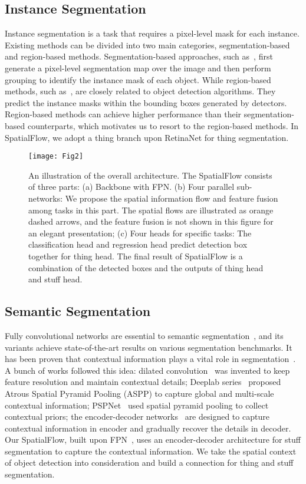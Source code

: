 \documentclass[journal,final]{IEEEtran}
\begin{document}
\subsection{Instance Segmentation} 
Instance segmentation is a task that requires a pixel-level mask for each instance. Existing methods can be divided into two main categories, segmentation-based and region-based methods. Segmentation-based approaches, such as~\cite{instancelevelseg,categorylevelinstancelevelseg}, first generate a pixel-level segmentation map over the image and then perform grouping to identify the instance mask of each object. While region-based methods, such as~\cite{maskrcnn,panet,htc}, are closely related to object detection algorithms. They predict the instance masks within the bounding boxes generated by detectors. Region-based methods can achieve higher performance than their segmentation-based counterparts, which motivates us to resort to the region-based methods. In SpatialFlow, we adopt a thing branch upon RetinaNet for thing segmentation.
\begin{figure*}
  \centering
  \texttt{[image: Fig2]}
  \caption{An illustration of the overall architecture. The SpatialFlow consists of three parts: (a) Backbone with FPN. (b) Four parallel sub-networks: We propose the spatial information flow and feature fusion among tasks in this part. The spatial flows are illustrated as orange dashed arrows, and the feature fusion is not shown in this figure for an elegant presentation; (c) Four heads for specific tasks: The classification head and regression head predict detection box together for thing head. The final result of SpatialFlow is a combination of the detected boxes and the outputs of thing head and stuff head.}
   \label{fig1}
\end{figure*}

\subsection{Semantic Segmentation} 
Fully convolutional networks are essential to semantic segmentation~\cite{fcn}, and its variants achieve state-of-the-art results on various segmentation benchmarks. It has been proven that contextual information plays a vital role in segmentation~\cite{contextrole}. A bunch of works followed this idea: dilated convolution~\cite{dilatedconv} was invented to keep feature resolution and maintain contextual details; Deeplab series~\cite{deeplab,deeplabv3} proposed Atrous Spatial Pyramid Pooling (ASPP) to capture global and multi-scale contextual information; PSPNet~\cite{pspnet} used spatial pyramid pooling to collect contextual priors; the encoder-decoder networks~\cite{unet,learningdeconv} are designed to capture contextual information in encoder and gradually recover the details in decoder. Our SpatialFlow, built upon FPN~\cite{fpn}, uses an encoder-decoder architecture for stuff segmentation to capture the contextual information. We take the spatial context of object detection into consideration and build a connection for thing and stuff segmentation.
\end{document}
